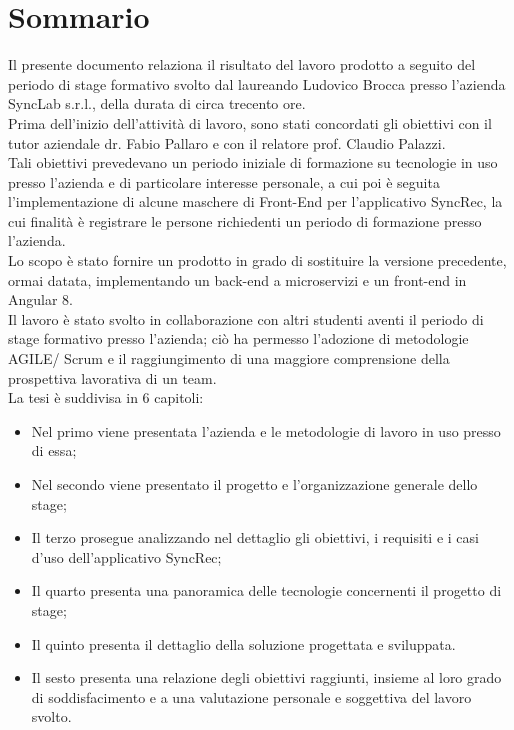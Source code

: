 
\cleardoublepage
{}
{}
\begingroup
\let\clearpage\relax
\let\cleardoublepage\relax
\let\cleardoublepage\relax

\chapter*{Sommario}

Il presente documento relaziona il risultato del lavoro prodotto a seguito del periodo di stage formativo svolto dal laureando Ludovico Brocca presso l'azienda SyncLab s.r.l., della durata di circa trecento ore.\\
Prima dell'inizio dell'attività di lavoro, sono stati concordati gli obiettivi con il tutor aziendale dr. Fabio Pallaro e con il relatore prof. Claudio Palazzi.\\
Tali obiettivi prevedevano un periodo iniziale di formazione su tecnologie in uso presso l'azienda e di particolare interesse personale, a cui poi è seguita l'implementazione di alcune maschere di Front-End per l'applicativo SyncRec, la cui finalità è registrare le persone richiedenti un periodo di formazione presso l'azienda.\\
Lo scopo è stato fornire un prodotto in grado di sostituire la versione precedente, ormai datata, implementando un back-end a microservizi e un front-end in Angular 8.\\
Il lavoro è stato svolto in collaborazione con altri studenti aventi il periodo di stage formativo presso l'azienda; ciò ha permesso l'adozione di metodologie AGILE/ Scrum e il raggiungimento di una maggiore comprensione della prospettiva lavorativa di un team.\\
La tesi è suddivisa in 6 capitoli:
\begin{itemize}
	\item Nel primo viene presentata l'azienda e le metodologie di lavoro in uso presso di essa;
	\item Nel secondo viene presentato il progetto e l'organizzazione generale dello stage;
	\item Il terzo prosegue analizzando nel dettaglio gli obiettivi, i requisiti e i casi d'uso dell'applicativo SyncRec; 
	\item Il quarto presenta una panoramica delle tecnologie concernenti il progetto di stage;
	\item Il quinto presenta il dettaglio della soluzione progettata e sviluppata.
	\item Il sesto presenta una relazione degli obiettivi raggiunti, insieme al loro grado di soddisfacimento e a una valutazione personale e soggettiva del lavoro svolto.
\end{itemize}
